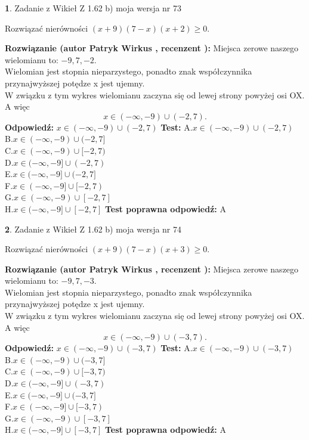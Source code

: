 \documentclass[12pt, a4paper]{article}
\theoremstyle{definition} %
\newtheorem{zad}{}
\newcommand{\zadStart}[1]{\begin{zad}#1\newline}
\newcommand{\zadStop}{\end{zad}}
\newcommand{\rozwStart}[2]{\noindent \textbf{Rozwiązanie (autor #1 , recenzent #2): }\newline}
\newcommand{\rozwStop}{\newline}
\newcommand{\odpStart}{\noindent \textbf{Odpowiedź:}\newline}
\newcommand{\odpStop}{\newline}
\newcommand{\testStart}{\noindent \textbf{Test:}\newline}
\newcommand{\testStop}{\newline}
\newcommand{\kluczStart}{\noindent \textbf{Test poprawna odpowiedź:}\newline}
\newcommand{\kluczStop}{\newline}
\begin{document}
\zadStart{Zadanie z Wikieł Z 1.62 b) moja wersja nr 73}

Rozwiązać nierówności $(x+9)(7-x)(x+2)\ge0$.
\zadStop
\rozwStart{Patryk Wirkus}{}
Miejsca zerowe naszego wielomianu to: $-9, 7, -2$.\\
Wielomian jest stopnia nieparzystego, ponadto znak współczynnika przy\linebreak najwyższej potędze x jest ujemny.\\ W związku z tym wykres wielomianu zaczyna się od lewej strony powyżej osi OX. A więc $$x \in (-\infty,-9) \cup (-2,7).$$
\rozwStop
\odpStart
$x \in (-\infty,-9) \cup (-2,7)$
\odpStop
\testStart
A.$x \in (-\infty,-9) \cup (-2,7)$\\
B.$x \in (-\infty,-9) \cup (-2,7]$\\
C.$x \in (-\infty,-9) \cup [-2,7)$\\
D.$x \in (-\infty,-9] \cup (-2,7)$\\
E.$x \in (-\infty,-9] \cup (-2,7]$\\
F.$x \in (-\infty,-9] \cup [-2,7)$\\
G.$x \in (-\infty,-9) \cup [-2,7]$\\
H.$x \in (-\infty,-9] \cup [-2,7]$
\testStop
\kluczStart
A
\kluczStop



\zadStart{Zadanie z Wikieł Z 1.62 b) moja wersja nr 74}

Rozwiązać nierówności $(x+9)(7-x)(x+3)\ge0$.
\zadStop
\rozwStart{Patryk Wirkus}{}
Miejsca zerowe naszego wielomianu to: $-9, 7, -3$.\\
Wielomian jest stopnia nieparzystego, ponadto znak współczynnika przy\linebreak najwyższej potędze x jest ujemny.\\ W związku z tym wykres wielomianu zaczyna się od lewej strony powyżej osi OX. A więc $$x \in (-\infty,-9) \cup (-3,7).$$
\rozwStop
\odpStart
$x \in (-\infty,-9) \cup (-3,7)$
\odpStop
\testStart
A.$x \in (-\infty,-9) \cup (-3,7)$\\
B.$x \in (-\infty,-9) \cup (-3,7]$\\
C.$x \in (-\infty,-9) \cup [-3,7)$\\
D.$x \in (-\infty,-9] \cup (-3,7)$\\
E.$x \in (-\infty,-9] \cup (-3,7]$\\
F.$x \in (-\infty,-9] \cup [-3,7)$\\
G.$x \in (-\infty,-9) \cup [-3,7]$\\
H.$x \in (-\infty,-9] \cup [-3,7]$
\testStop
\kluczStart
A
\kluczStop
\end{document}
